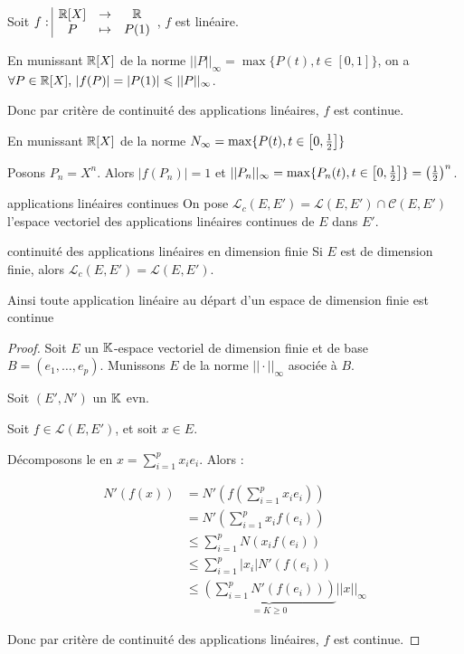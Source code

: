 \begin{exemple}
    Soit $f: \space \begin{array}{|ccc} \displaystyle \mathbb{R}[X] & \to & \displaystyle \mathbb{R} \\ \displaystyle P & \mapsto & \displaystyle P(1) \end{array}$, $f$ est linéaire. 

    \avspace En munissant $\mathbb{R}[X]$ de la norme $||P||_\infty = \max\{P(t), t \in [0, 1]\}$, on a 
    $\forall P \in \mathbb{R}[X], \, |f(P)| = |P(1)| \leqslant ||P||_\infty$.

    Donc par critère de continuité des applications linéaires, $f$ est continue.

    \avspace En munissant $\mathbb{R}[X]$ de la norme $N_\infty = \max\{P(t), t \in \left[0, \frac 1 2\right]\}$

    Posons $P_n = X^n$. Alors $| f(P_n) | = 1$ et $||P_n||_\infty = \max\{P_n(t), t \in \left[0, \frac 1 2\right]\} = \left(\frac 1 2\right)^n$.
\end{exemple}

\begin{definition}{applications linéaires continues}{}
    On pose $\mathscr L_c(E, E') = \mathscr L (E, E') \cap \mathscr C(E, E')$ l'espace vectoriel 
    des applications linéaires continues de $E$ dans $E'$.
\end{definition}

\begin{theoreme}{continuité des applications linéaires en dimension finie}{}
    Si $E$ est de dimension finie, alors $\mathscr L_c(E, E') = \mathscr L(E, E')$.

    Ainsi toute application linéaire au départ d'un espace de dimension finie est continue
\end{theoreme}

\begin{proof}
    Soit $E$ un $\mathbb{K}$-espace vectoriel de dimension finie et de base 
    $B = (e_1, \ldots, e_p)$. Munissons $E$ de la norme $||\cdot||_\infty$ asociée à $B$.

    Soit $(E', N')$ un $\mathbb{K}$ evn. 

    Soit $f \in \mathscr L(E, E')$, et soit $x \in E$. 

    Décomposons le en $\displaystyle x = \sum_{i=1}^p x_i e_i$. Alors : 

    \begin{align*}
        N'(f(x)) & = N'\left( f\left( \sum_{i=1}^p x_i e_i \right) \right) \\
        & = N'\left( \sum_{i=1}^p x_i f(e_i) \right) \\
        & \leqslant \sum_{i=1}^p N(x_i f(e_i)) \\
        & \leqslant \sum_{i=1}^p |x_i| N'(f(e_i)) \\
        & \leqslant \underbrace{\left( \sum_{i=1}^p N'(f(e_i)) \right)}_{ = K \geqslant 0} ||x||_\infty
    \end{align*}

    Donc par critère de continuité des applications linéaires, $f$ est continue.
\end{proof}


